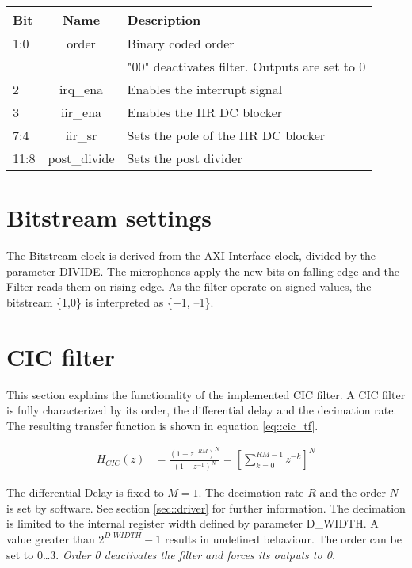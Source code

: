 \begin{table}[h]
	\centering
	\label{tbl::status_register}
	\begin{tabular}{|l|c|l|}
		\hline 
		Bit		& Name 	& Description \\
		\hline 
		1:0		& order	& Binary coded order \\
				& 		& "00" deactivates filter. Outputs are set to 0 \\
		\hline 
		2 		& irq\_ena	& Enables the interrupt signal\\
		\hline 
		3		& iir\_ena	& Enables the IIR DC blocker \\
		\hline 
		7:4		& iir\_sr	& Sets the pole of the IIR DC blocker \\
		\hline 
		11:8	& post\_divide & Sets the post divider \\
		\hline 
	\end{tabular} 
\end{table}

\section{Bitstream settings}
\label{sec::bitstream}
The Bitstream clock is derived from the AXI Interface clock, divided by the parameter DIVIDE.
The microphones apply the new bits on falling edge and the Filter reads them on rising edge.
As the filter operate on signed values, the bitstream \{1,0\} is interpreted as \{+1, --1\}.

\section{CIC filter}
\label{sec::cic}

This section explains the functionality of the implemented CIC filter.
A CIC filter is fully characterized by its order, the differential delay and the decimation rate.
The resulting transfer function is shown in equation \ref{eq::cic_tf}.

\begin{align}
	H_{CIC}(z) &= \frac{\left(1-z^{-RM}\right)^N}{\left(1-z^{-1}\right)^N} = \left[\sum_{k=0}^{RM-1}z^{-k}\right]^N\label{eq::cic_tf}
\end{align}

The differential Delay is fixed to $M=1$.
The decimation rate $R$ and the order $N$ is set by software.
See section \ref{sec::driver} for further information.
The decimation is limited to the internal register width defined by parameter D\_WIDTH.
A value greater than $2^{D\_WIDTH} - 1$ results in undefined behaviour.
The order can be set to 0\ldots3.
\emph{Order 0 deactivates the filter and forces its outputs to 0.}

